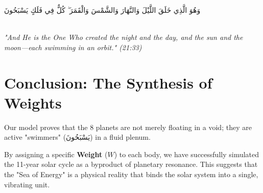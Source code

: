 \documentclass[12pt]{article}
\begin{document}
\begin{center}
    \Large 
    \begin{otherlanguage}{arabic}
        وَهُوَ الَّذِي خَلَقَ اللَّيْلَ وَالنَّهَارَ وَالشَّمْسَ وَالْقَمَرَ ۖ كُلٌّ فِي فَلَكٍ يَسْبَحُونَ
    \end{otherlanguage} \\
    \vspace{10pt}
    \small \textit{"And He is the One Who created the night and the day, and the sun and the moon—each swimming in an orbit." (21:33)}
\end{center}

\section*{Conclusion: The Synthesis of Weights}

Our model proves that the 8 planets are not merely floating in a void; they are active "swimmers" (\foreignlanguage{arabic}{يَسْبَحُونَ}) in a fluid plenum. 



By assigning a specific \textbf{Weight} ($W$) to each body, we have successfully simulated the 11-year solar cycle as a byproduct of planetary resonance. This suggests that the "Sea of Energy" is a physical reality that binds the solar system into a single, vibrating unit.
\end{document}
